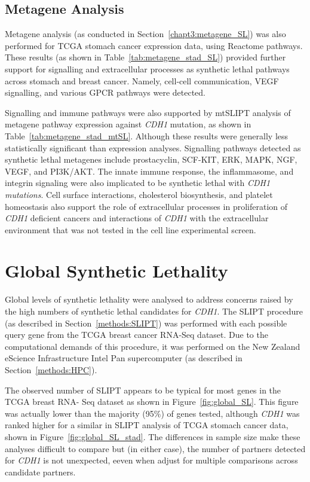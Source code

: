 \subsection{Metagene Analysis} \label{chapt3:metagene_stad_SL}

Metagene analysis (as conducted in Section~\ref{chapt3:metagene_SL}) was also performed for TCGA stomach cancer expression data, using Reactome pathways. These results (as shown in Table~\ref{tab:metagene_stad_SL}) provided further support for signalling and extracellular processes as synthetic lethal pathways across stomach and breast cancer. Namely, cell-cell communication, VEGF signalling, and various GPCR pathways were detected.  

Signalling and immune pathways were also supported by mtSLIPT analysis of metagene pathway expression against \textit{CDH1} mutation, as shown in Table~\ref{tab:metagene_stad_mtSL}. Although these results were generally less statistically significant than expression analyses. Signalling pathways detected as synthetic lethal metagenes include prostacyclin, SCF-KIT, ERK, MAPK, NGF, VEGF, and PI3K/AKT. The innate immune response, the inflammasome, and integrin signaling were also implicated to be synthetic lethal with \textit{CDH1 mutations}. Cell surface interactions, cholesterol biosynthesis, and platelet homeostasis also support the role of extracellular processes in proliferation of \textit{CDH1} deficient cancers and interactions of \textit{CDH1} with the extracellular environment that was not tested in the cell line experimental screen.


\FloatBarrier

\section{Global Synthetic Lethality}

Global levels of synthetic lethality were analysed to address concerns raised by the high numbers of synthetic lethal candidates for \textit{CDH1}. The SLIPT procedure (as described in Section~\ref{methods:SLIPT}) was performed with each possible query gene from the TCGA breast cancer RNA-Seq dataset. Due to the computational demands of this procedure, it was performed on the New Zealand eScience Infrastructure Intel Pan supercomputer (as described in Section~\ref{methods:HPC}).

The observed number of SLIPT appears to be typical for most genes in the TCGA breast RNA- Seq dataset as shown in Figure~\ref{fig:global_SL}. This figure was actually lower than the majority (95\%) of genes tested, although \textit{CDH1} was ranked higher for a similar in SLIPT analysis of TCGA stomach cancer data, shown in Figure~\ref{fig:global_SL_stad}. The differences in sample size make these analyses difficult to compare but (in either case), the number of partners detected for \textit{CDH1} is not unexpected, eeven when adjust for multiple comparisons across candidate partners.

